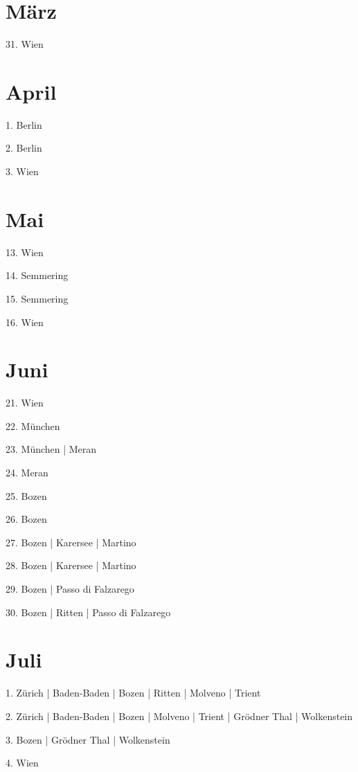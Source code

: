 \documentclass[twoside=false,titlepage=false,open=any, parskip=never, fontsize=10pt, headings=small, chapterprefix=false, appendixprefix=false, DIV=15]{scrbook}
\begin{document}
\begin{multicols}{3}
            \section*{März}
            31. Wien\par
            \section*{April}
            1. Berlin\par
            2. Berlin\par
            3. Wien\par
            \section*{Mai}
            13. Wien\par
            14. Semmering\par
            15. Semmering\par
            16. Wien\par
            \section*{Juni}
            21. Wien\par
            22. München\par
            23. München | Meran\par
            24. Meran\par
            25. Bozen\par
            26. Bozen\par
            27. Bozen | Karersee | Martino\par
            28. Bozen | Karersee | Martino\par
            29. Bozen | Passo di Falzarego\par
            30. Bozen | Ritten | Passo di Falzarego\par
            \section*{Juli}
            1. Zürich | Baden-Baden | Bozen | Ritten | Molveno | Trient\par
            2. Zürich | Baden-Baden | Bozen | Molveno | Trient | Grödner Thal | Wolkenstein\par
            3. Bozen | Grödner Thal | Wolkenstein\par
            4. Wien\par

\end{multicols}
\end{document}
